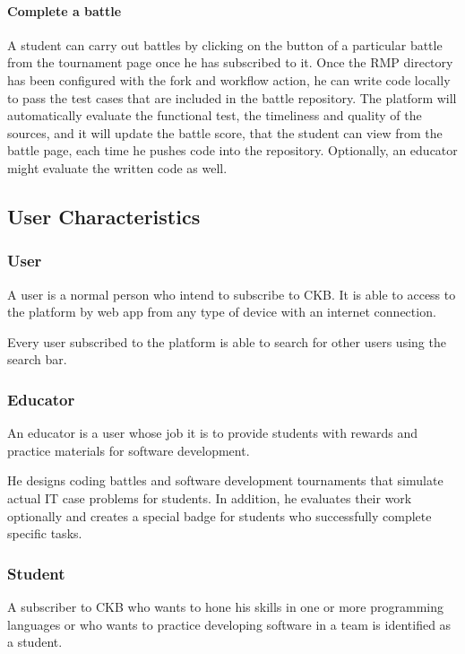 \paragraph{Complete a battle}
A student can carry out battles by clicking on the button of a particular battle from the tournament page once he has subscribed to it. Once the RMP directory has been configured with the fork and workflow action, he can write code 
locally to pass the test cases that are included in the battle repository. The platform will automatically evaluate the functional test, the timeliness and quality of the sources, and it will update the battle score, that the student 
can view from the battle page, each time he pushes code into the repository. Optionally, an educator might evaluate the written code as well.

\subsection{User Characteristics}

\subsubsection{User}
A user is a normal person who intend to subscribe to CKB. It is able to access to the platform by web app from any type of device with an internet connection.

Every user subscribed to the platform is able to search for other users using the search bar.

\subsubsection{Educator}
An educator is a user whose job it is to provide students with rewards and practice materials for software development.

He designs coding battles and software development tournaments that simulate actual IT case problems for students. In addition, he evaluates their work optionally and creates a special badge for students who successfully complete 
specific tasks.

\subsubsection{Student}
A subscriber to CKB who wants to hone his skills in one or more programming languages or who wants to practice developing software in a team is identified as a student.

